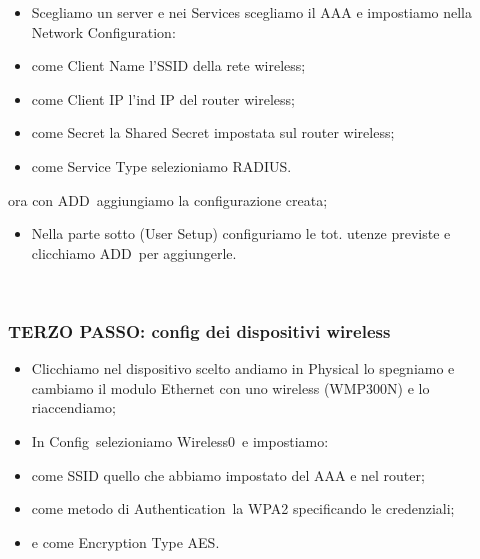 \documentclass[
]{article}
\providecommand{\tightlist}{%
  \setlength{\itemsep}{0pt}\setlength{\parskip}{0pt}}
\begin{document}
{}

\begin{itemize}
\tightlist
\item
  {Scegliamo un server e nei }{Services }{scegliamo il AAA e impostiamo
  nella }{Network Configuration}{:}
\end{itemize}

\begin{itemize}
\tightlist
\item
  {come Client Name l'SSID della rete wireless;}
\item
  {come Client IP l'ind IP del router wireless;}
\item
  {come Secret la Shared Secret impostata sul router wireless;}
\item
  {come Service Type selezioniamo RADIUS.}
\end{itemize}

{ora con }{ADD}{~aggiungiamo la configurazione creata;}

\begin{itemize}
\tightlist
\item
  {Nella parte sotto (}{User Setup}{) configuriamo le tot. utenze
  previste e clicchiamo }{ADD}{~per }{aggiungerle.}{~}
\end{itemize}

{}

{}

{~}

\subsubsection{\texorpdfstring{{TERZO PASSO: config dei dispositivi
wireless}}{TERZO PASSO: config dei dispositivi wireless}}\label{h.1t3h5sf}

{}

\begin{itemize}
\tightlist
\item
  {Clicchiamo nel dispositivo scelto andiamo in }{Physical }{lo
  spegniamo e cambiamo il modulo Ethernet con uno wireless (}{WMP300N}{)
  e lo riaccendiamo;}
\item
  {In }{Config}{~selezioniamo }{Wireless0}{~e impostiamo:}
\end{itemize}

\begin{itemize}
\tightlist
\item
  {come SSID quello che abbiamo impostato del AAA e nel router;}
\item
  {come metodo di }{Authentication}{~la }{WPA2 }{specificando le
  credenziali;}
\item
  {e come Encryption Type }{AES}{.}
\end{itemize}
\end{document}

